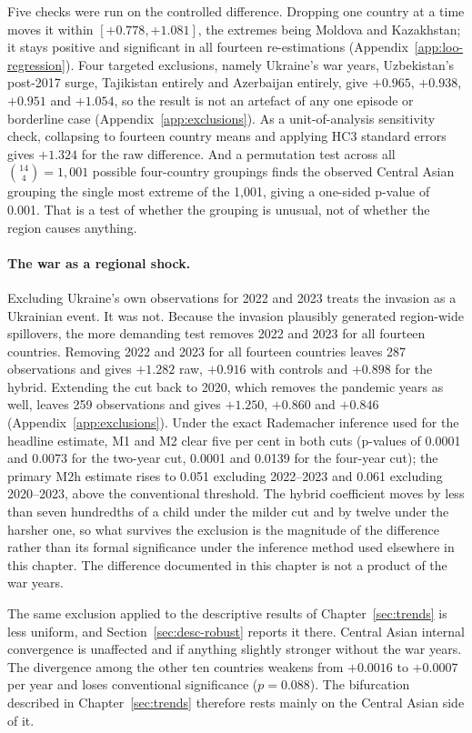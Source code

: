 Five checks were run on the controlled difference. Dropping one country at a time moves it within $[+0.778, +1.081]$, the extremes being Moldova and Kazakhstan; it stays positive and significant in all fourteen re-estimations (Appendix~\ref{app:loo-regression}). Four targeted exclusions, namely Ukraine's war years, Uzbekistan's post-2017 surge, Tajikistan entirely and Azerbaijan entirely, give $+0.965$, $+0.938$, $+0.951$ and $+1.054$, so the result is not an artefact of any one episode or borderline case (Appendix~\ref{app:exclusions}). As a unit-of-analysis sensitivity check, collapsing to fourteen country means and applying HC3 standard errors gives $+1.324$ for the raw difference. And a permutation test across all $\binom{14}{4} = 1{,}001$ possible four-country groupings finds the observed Central Asian grouping the single most extreme of the 1{,}001, giving a one-sided p-value of 0.001. That is a test of whether the grouping is unusual, not of whether the region causes anything.

\paragraph{The war as a regional shock.} Excluding Ukraine's own observations for 2022 and 2023 treats the invasion as a Ukrainian event. It was not. Because the invasion plausibly generated region-wide spillovers, the more demanding test removes 2022 and 2023 for all fourteen countries. Removing 2022 and 2023 for all fourteen countries leaves 287 observations and gives $+1.282$ raw, $+0.916$ with controls and $+0.898$ for the hybrid. Extending the cut back to 2020, which removes the pandemic years as well, leaves 259 observations and gives $+1.250$, $+0.860$ and $+0.846$ (Appendix~\ref{app:exclusions}). Under the exact Rademacher inference used for the headline estimate, M1 and M2 clear five per cent in both cuts (p-values of 0.0001 and 0.0073 for the two-year cut, 0.0001 and 0.0139 for the four-year cut); the primary M2h estimate rises to 0.051 excluding 2022--2023 and 0.061 excluding 2020--2023, above the conventional threshold. The hybrid coefficient moves by less than seven hundredths of a child under the milder cut and by twelve under the harsher one, so what survives the exclusion is the magnitude of the difference rather than its formal significance under the inference method used elsewhere in this chapter. The difference documented in this chapter is not a product of the war years.

The same exclusion applied to the descriptive results of Chapter~\ref{sec:trends} is less uniform, and Section~\ref{sec:desc-robust} reports it there. Central Asian internal convergence is unaffected and if anything slightly stronger without the war years. The divergence among the other ten countries weakens from $+0.0016$ to $+0.0007$ per year and loses conventional significance ($p = 0.088$). The bifurcation described in Chapter~\ref{sec:trends} therefore rests mainly on the Central Asian side of it.

